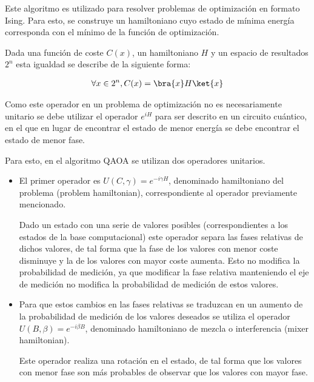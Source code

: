 
Este algoritmo es utilizado para resolver problemas de optimización en formato Ising.  %
Para esto, se construye un hamiltoniano cuyo estado de mínima energía corresponda con el mínimo de la función de optimización.

Dada una función de coste $C(x)$, un hamiltoniano $H$ y un espacio de resultados $2^{n}$ esta igualdad se describe de la siguiente forma:

\begin{align*}
  \forall{x \in 2^{n}}, C(x) = \bra{x}H\ket{x}
\end{align*}

Como este operador en un problema de optimización no es necesariamente unitario se debe utilizar el operador $e^{iH}$ para ser descrito en un circuito cuántico,  %
en el que en lugar de encontrar el estado de menor energía se debe encontrar el estado de menor fase.  %

Para esto, en el algoritmo QAOA se utilizan dos operadores unitarios.
\begin{itemize}
\item El primer operador es $U(C, \gamma) = e^{-i \gamma H}$, denominado hamiltoniano del problema (problem hamiltonian), correspondiente al operador previamente mencionado.

  Dado un estado con una serie de valores posibles (correspondientes a los estados de la base computacional) este operador separa las fases relativas de dichos valores, de tal forma que la fase de los valores con menor coste disminuye y la de los valores con mayor coste aumenta. Esto no modifica la probabilidad de medición, ya que modificar la fase relativa manteniendo el eje de medición no modifica la probabilidad de medición de estos valores.

\item Para que estos cambios en las fases relativas se traduzcan en un aumento de la probabilidad de medición de los valores deseados se utiliza el operador $U(B, \beta) = e^{-i \beta B}$, denominado hamiltoniano de mezcla o interferencia (mixer hamiltonian).

  Este operador realiza una rotación en el estado, de tal forma que los valores con menor fase son más probables de observar que los valores con mayor fase.

\end{itemize}

